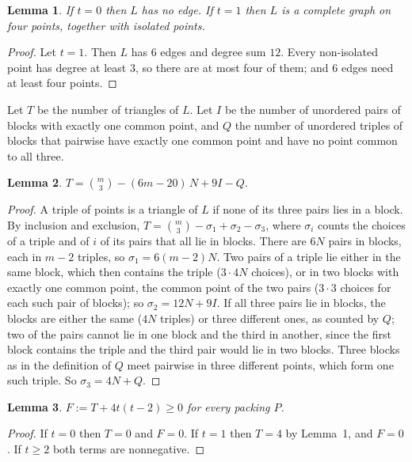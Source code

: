 \documentclass[11pt,a4paper]{article}
\newtheorem{lemma}{Lemma}
\begin{document}
\begin{lemma}
If $t=0$ then $L$ has no edge. If $t=1$ then $L$ is a complete graph on
four points, together with isolated points.
\end{lemma}

\begin{proof}
Let $t=1$. Then $L$ has $6$ edges and degree sum $12$. Every non-isolated
point has degree at least $3$, so there are at most four of them; and $6$
edges need at least four points.
\end{proof}

Let $T$ be the number of triangles of $L$. Let $I$ be the number of
unordered pairs of blocks with exactly one common point, and $Q$ the number
of unordered triples of blocks that pairwise have exactly one common point
and have no point common to all three.

\begin{lemma}
$T=\binom m3-(6m-20)\,N+9I-Q$.
\end{lemma}

\begin{proof}
A triple of points is a triangle of $L$ if none of its three pairs lies in a
block. By inclusion and exclusion, $T=\binom m3-\sigma_1+\sigma_2-\sigma_3$,
where $\sigma_i$ counts the choices of a triple and of $i$ of its pairs that
all lie in blocks. There are $6N$ pairs in blocks, each in $m-2$ triples, so
$\sigma_1=6(m-2)N$. Two pairs of a triple lie either in the same block,
which then contains the triple ($3\cdot 4N$ choices), or in two blocks with
exactly one common point, the common point of the two pairs ($3\cdot3$
choices for each such pair of blocks); so $\sigma_2=12N+9I$. If all three
pairs lie in blocks, the blocks are either the same ($4N$ triples) or three
different ones, as counted by $Q$; two of the pairs cannot lie in one block
and the third in another, since the first block contains the triple and the
third pair would lie in two blocks. Three blocks as in the definition of
$Q$ meet pairwise in three different points, which form one such triple.
So $\sigma_3=4N+Q$.
\end{proof}

\begin{lemma}
$F:=T+4t(t-2)\ge 0$ for every packing $P$.
\end{lemma}

\begin{proof}
If $t=0$ then $T=0$ and $F=0$. If $t=1$ then $T=4$ by Lemma~1, and $F=0$.
If $t\ge 2$ both terms are nonnegative.
\end{proof}
\end{document}
